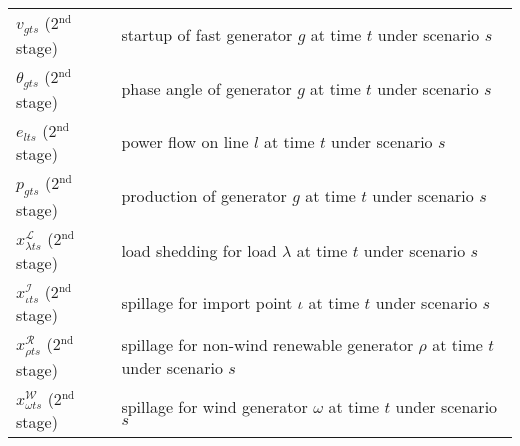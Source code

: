 \begin{table}[H]
\begin{tabular}{ll}
		$v_{gts}$ (2$^{\textrm{nd}}$ stage)	&	startup of fast generator $g$ at time $t$ under scenario $s$\\
		$\theta_{gts}$ (2$^{\textrm{nd}}$ stage)	&	phase angle of generator $g$ at time $t$ under scenario $s$\\
		$e_{lts}$ (2$^{\textrm{nd}}$ stage)	&	power flow on line $l$ at time $t$ under scenario $s$\\
		$p_{gts}$ (2$^{\textrm{nd}}$ stage)	&	production of generator $g$ at time $t$ under scenario $s$\\
		$x_{\lambda ts}^\mathcal{L}$	(2$^{\textrm{nd}}$ stage) & load shedding for load $\lambda$ at time $t$ under scenario $s$	\\
		$x_{\iota ts}^\mathcal{I}$	(2$^{\textrm{nd}}$ stage) &	spillage for import point $\iota$ at time $t$ under scenario $s$\\
		$x_{\rho ts}^\mathcal{R}$ (2$^{\textrm{nd}}$ stage)	& spillage for non-wind renewable generator $\rho$ at time $t$ under scenario $s$  	\\
		$x_{\omega ts}^\mathcal{W}$ (2$^{\textrm{nd}}$ stage)	& spillage for wind generator $\omega$ at time $t$ under scenario $s$ 	\\
		\hline
	\end{tabular}
\end{table}


